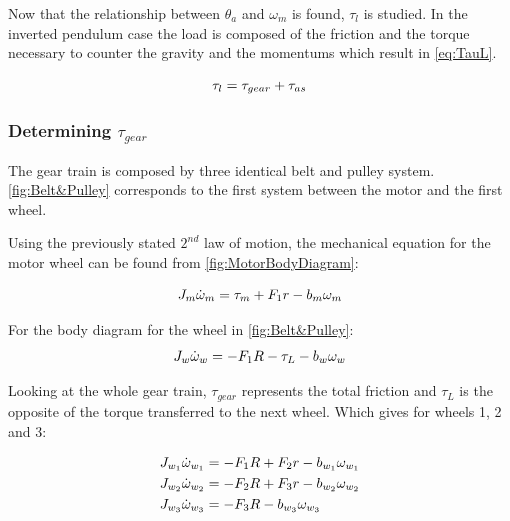 Now that the relationship between $\theta_a$ and $\omega_m$ is found, $\tau_l$ is studied. In the inverted pendulum case the load is composed of the friction and the torque necessary to counter the gravity and the momentums which result in \autoref{eq:TauL}.

\begin{equation}\label{eq:TauL}
	\tau_l = \tau_{gear} + \tau_{as} \addunit{\newton\meter}
\end{equation}
\startexplain
{}
\stopexplain


\subsubsection*{Determining $\tau_{gear}$}
The gear train is composed by three identical belt and pulley system. \autoref{fig:Belt&Pulley} corresponds to the first system between the motor and the first wheel. 

Using the previously stated $2^{nd}$ law of motion, the mechanical equation for the motor wheel can be found from \autoref{fig:MotorBodyDiagram}:

\begin{equation}
    J_m \dot{\omega}_m = \tau_m + F_1r - b_m\omega_m \addunit{\newton\meter}
    \label{eq:MotorfreeBody}
\end{equation}

For the body diagram for the wheel in \autoref{fig:Belt&Pulley}:
\begin{equation}
	J_w\dot{\omega}_w = -F_1R -\tau_L -b_w\omega_w \addunit{\newton\meter}
\end{equation}

Looking at the whole gear train, $\tau_{gear}$ represents the total friction and $\tau_L$ is the opposite of the torque transferred to the next wheel. Which gives for wheels 1, 2 and 3:

\begin{subequations} 
	\begin{flalign} \label{eq:GiveMeAnOriginalName}
		&J_{w_1}\dot{\omega}_{w_1} = -F_1R + F_2r -b_{w_1}\omega_{w_1} \addunit{\newton\meter}\\ 
		&J_{w_2}\dot{\omega}_{w_2} = -F_2R + F_3r -b_{w_2}\omega_{w_2} \addunit{\newton\meter}\\ 
		&J_{w_3}\dot{\omega}_{w_3} = -F_3R - b_{w_3}\omega_{w_3} \addunit{\newton\meter}
	\end{flalign}
\end{subequations}

